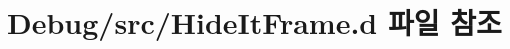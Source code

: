 \hypertarget{_hide_it_frame_8d}{\section{Debug/src/\+Hide\+It\+Frame.d 파일 참조}
\label{_hide_it_frame_8d}
}

